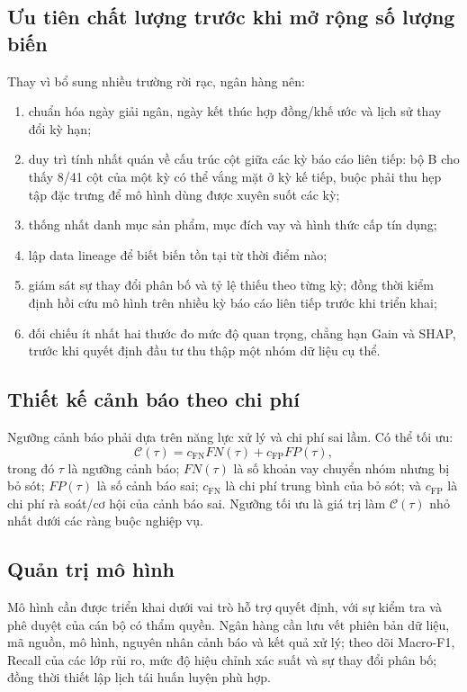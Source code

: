 \subsection{Ưu tiên chất lượng trước khi mở rộng số lượng biến}

Thay vì bổ sung nhiều trường rời rạc, ngân hàng nên:

\begin{enumerate}
    \item chuẩn hóa ngày giải ngân, ngày kết thúc hợp đồng/khế ước và lịch sử thay đổi kỳ hạn;
    \item duy trì tính nhất quán về cấu trúc cột giữa các kỳ báo cáo liên tiếp: bộ B cho thấy 8/41 cột của một kỳ có thể vắng mặt ở kỳ kế tiếp, buộc phải thu hẹp tập đặc trưng để mô hình dùng được xuyên suốt các kỳ;
    \item thống nhất danh mục sản phẩm, mục đích vay và hình thức cấp tín dụng;
    \item lập data lineage để biết biến tồn tại từ thời điểm nào;
    \item giám sát sự thay đổi phân bố và tỷ lệ thiếu theo từng kỳ; đồng thời kiểm định hồi cứu mô hình trên nhiều kỳ báo cáo liên tiếp trước khi triển khai;
    \item đối chiếu ít nhất hai thước đo mức độ quan trọng, chẳng hạn Gain và SHAP, trước khi quyết định đầu tư thu thập một nhóm dữ liệu cụ thể.
\end{enumerate}

\subsection{Thiết kế cảnh báo theo chi phí}
\label{sec:recommend-cost}

Ngưỡng cảnh báo phải dựa trên năng lực xử lý và chi phí sai lầm. Có thể tối ưu:
\[
\mathcal{C}(\tau)
=c_{\mathrm{FN}}FN(\tau)+c_{\mathrm{FP}}FP(\tau),
\]
trong đó $\tau$ là ngưỡng cảnh báo; $FN(\tau)$ là số khoản vay chuyển nhóm nhưng bị bỏ sót; $FP(\tau)$ là số cảnh báo sai; $c_{\mathrm{FN}}$ là chi phí trung bình của bỏ sót; và $c_{\mathrm{FP}}$ là chi phí rà soát/cơ hội của cảnh báo sai. Ngưỡng tối ưu là giá trị làm $\mathcal{C}(\tau)$ nhỏ nhất dưới các ràng buộc nghiệp vụ.

\subsection{Quản trị mô hình}

Mô hình cần được triển khai dưới vai trò hỗ trợ quyết định, với sự kiểm tra và phê duyệt của cán bộ có thẩm quyền. Ngân hàng cần lưu vết phiên bản dữ liệu, mã nguồn, mô hình, nguyên nhân cảnh báo và kết quả xử lý; theo dõi Macro-F1, Recall của các lớp rủi ro, mức độ hiệu chỉnh xác suất và sự thay đổi phân bố; đồng thời thiết lập lịch tái huấn luyện phù hợp.

